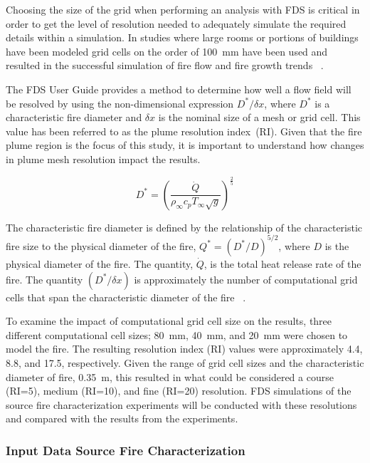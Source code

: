 \documentclass[twoside]{uocthesis}
\begin{document}
{Choosing the size of the grid when performing an analysis with FDS is critical in order to get the level of resolution needed to adequately simulate the required details within a simulation. In studies where large rooms or portions of buildings have been modeled grid cells on the order of 100~mm have been used and resulted in the successful simulation of fire flow and fire growth trends ~\cite{Grosshandler:Station,Madrzykowski:2004,Vettori:2000, Barowy:2012,Overholt:San_Francisco,Weinschenk:Chicago}.

 The FDS User Guide provides a method to determine how well a flow field will be resolved by using the non-dimensional expression ${D^*}/{\delta x}$, where $D^*$ is a characteristic fire diameter and $\delta x$ is the nominal size of a mesh or grid cell. This value has been referred to as the plume resolution index~(RI). Given that the fire plume region is the focus of this study, it is important to understand how changes in plume mesh resolution impact the results.    

\begin{equation}
 D^* = \left(
     \frac{\dot Q}{\rho_\infty  c_p  T_\infty  \sqrt{g} }
     \right)^\frac{2}{5} 
 \end{equation}

The characteristic fire diameter is defined by the relationship of the characteristic fire size to the physical diameter of the fire, ${Q^*} = ({D^*}/{D})^{5/2}$, where $D$ is the physical diameter of the fire. The quantity, $\dot Q$, is the total heat release rate of the fire. The quantity $({D^*}/{\delta x})$ is approximately the number of computational grid cells that span the characteristic diameter of the fire ~\cite{FDS_Users_Guide,FDS_Validation_Guide}.  

To examine the impact of computational grid cell size on the results, three different computational cell sizes; 80~mm, 40~mm, and 20~mm were chosen to model the fire. The resulting resolution index (RI) values were approximately 4.4, 8.8, and 17.5, respectively. Given the range of grid cell sizes and the characteristic diameter of fire, 0.35~m, this resulted in what could be considered a course (RI=5), medium (RI=10), and fine (RI=20) resolution.  FDS simulations of the source fire characterization experiments will be conducted with these resolutions and compared with the results from the experiments.

\subsubsection{Input Data Source Fire Characterization}

}
\end{document}
